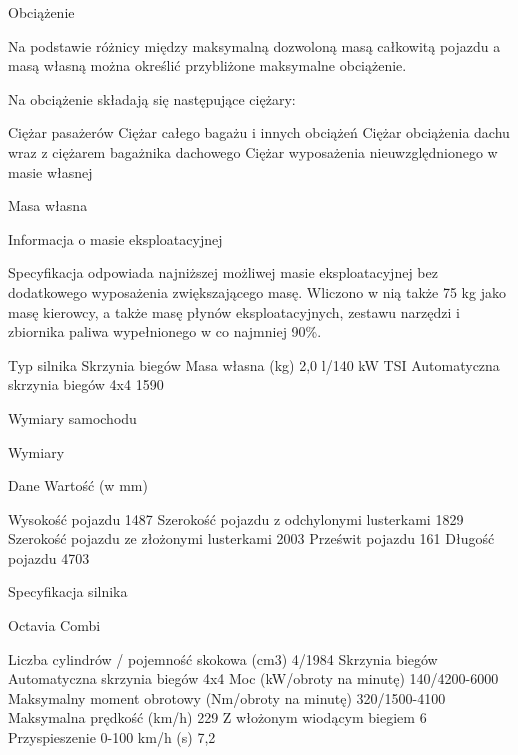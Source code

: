 Obciążenie

Na podstawie różnicy między maksymalną dozwoloną masą całkowitą pojazdu a masą własną można określić przybliżone maksymalne obciążenie.

Na obciążenie składają się następujące ciężary:
\begin{itemizeTriangle}
	\itemTriangle Ciężar pasażerów
	\itemTriangle Ciężar całego bagażu i innych obciążeń
	\itemTriangle Ciężar obciążenia dachu wraz z ciężarem bagażnika dachowego
	\itemTriangle Ciężar wyposażenia nieuwzględnionego w masie własnej
\end{itemizeTriangle}

Masa własna


Informacja o masie eksploatacyjnej

Specyfikacja odpowiada najniższej możliwej masie eksploatacyjnej bez dodatkowego wyposażenia zwiększającego masę. Wliczono w nią także 75 kg jako masę kierowcy, a także masę płynów eksploatacyjnych, zestawu narzędzi i zbiornika paliwa wypełnionego w co najmniej 90\%.


Typ silnika	Skrzynia biegów	Masa własna (kg)
2,0 l/140 kW TSI	Automatyczna skrzynia biegów 4x4	1590


Wymiary samochodu



Wymiary

Dane	Wartość (w mm)

Wysokość pojazdu	1487
Szerokość pojazdu z odchylonymi lusterkami	1829
Szerokość pojazdu ze złożonymi lusterkami	2003
Prześwit pojazdu	161
Długość pojazdu	4703


Specyfikacja silnika


Octavia Combi

Liczba cylindrów / pojemność skokowa (cm3)	4/1984
Skrzynia biegów	Automatyczna skrzynia biegów 4x4
Moc (kW/obroty na minutę)	140/4200-6000
Maksymalny moment obrotowy (Nm/obroty na minutę)	320/1500-4100
Maksymalna prędkość (km/h)	229
Z włożonym wiodącym biegiem	6
Przyspieszenie 0-100 km/h (s)	7,2





